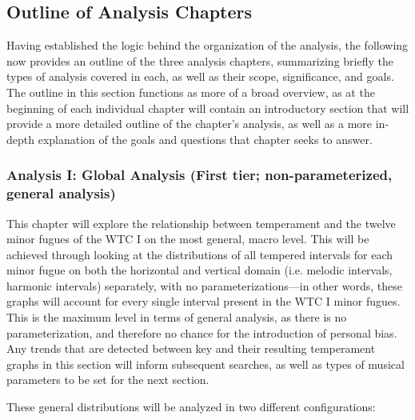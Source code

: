     \subsection{Outline of Analysis
Chapters}\label{outline-of-analysis-chapters}

Having established the logic behind the organization of the analysis,
the following now provides an outline of the three analysis chapters,
summarizing briefly the types of analysis covered in each, as well as
their scope, significance, and goals. The outline in this section
functions as more of a broad overview, as at the beginning of each
individual chapter will contain an introductory section that will
provide a more detailed outline of the chapter's analysis, as well as a
more in-depth explanation of the goals and questions that chapter seeks
to answer.

\subsubsection{Analysis I: Global Analysis (First tier;
non-parameterized, general
analysis)}\label{analysis-i-global-analysis-first-tier-non-parameterized-general-analysis}

This chapter will explore the relationship between temperament and the
twelve minor fugues of the WTC I on the most general, macro level. This
will be achieved through looking at the distributions of all tempered
intervals for each minor fugue on both the horizontal and vertical
domain (i.e. melodic intervals, harmonic intervals) separately, with no
parameterizations---in other words, these graphs will account for
every single interval present in the WTC I minor fugues. This is the
maximum level in terms of general analysis, as there is no
parameterization, and therefore no chance for the introduction of
personal bias. Any trends that are detected between key and their
resulting temperament graphs in this section will inform subsequent
searches, as well as types of musical parameters to be set for the next
section.

These general distributions will be analyzed in two different
configurations:

